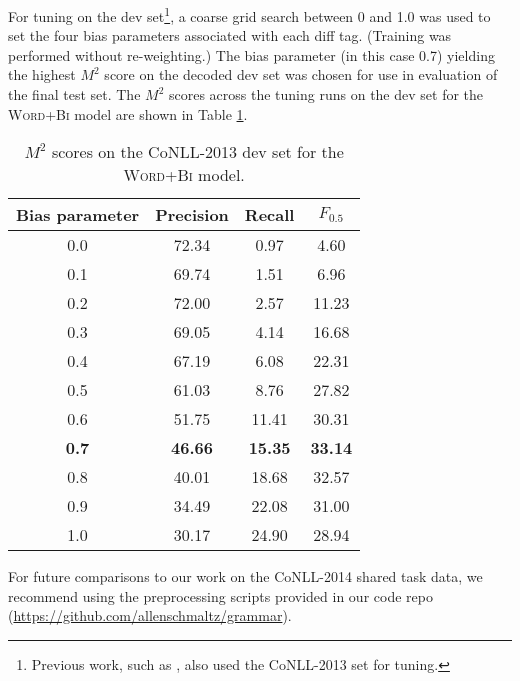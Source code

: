 \documentclass[11pt,letterpaper]{article}
\begin{document}
For tuning on the dev set\footnote{Previous work, such as , also used the CoNLL-2013 set for tuning.}, a coarse grid search between 0 and 1.0 was used to set the four bias parameters associated with each diff tag. (Training was performed without re-weighting.) The bias parameter (in this case 0.7) yielding the highest $M^2$ score on the decoded dev set was chosen for use in evaluation of the final test set. The $M^2$ scores across the tuning runs on the dev set for the \textsc{Word+Bi} model are shown in Table \ref{table:conll-tuning-weights}.

\begin{table}
\centering
\small
\begin{tabular}{cccc}
\toprule
Bias parameter & Precision & Recall & $F_{0.5}$ \\
\midrule
0.0 & 72.34 & 0.97 & 4.60 \\ 
0.1 &  69.74 & 1.51 & 6.96 \\  
0.2 &  72.00 & 2.57 & 11.23 \\  
0.3 & 69.05 & 4.14 & 16.68 \\  
0.4 & 67.19 & 6.08 & 22.31 \\  
0.5 & 61.03 & 8.76 & 27.82 \\  
0.6 & 51.75 & 11.41 & 30.31 \\  
\textbf{0.7} & \textbf{46.66} & \textbf{15.35} & \textbf{33.14} \\  
0.8 & 40.01 & 18.68 & 32.57 \\  
0.9 &  34.49 & 22.08 & 31.00 \\  
1.0 & 30.17 & 24.90 & 28.94  \\  
\bottomrule
\end{tabular}
\caption{\small{$M^2$ scores on the CoNLL-2013 dev set for the \textsc{Word+Bi} model.}}
\label{table:conll-tuning-weights}
\end{table}

For future comparisons to our work on the CoNLL-2014 shared task data, we recommend using the preprocessing scripts provided in our code repo (\url{https://github.com/allenschmaltz/grammar}).
\end{document}
